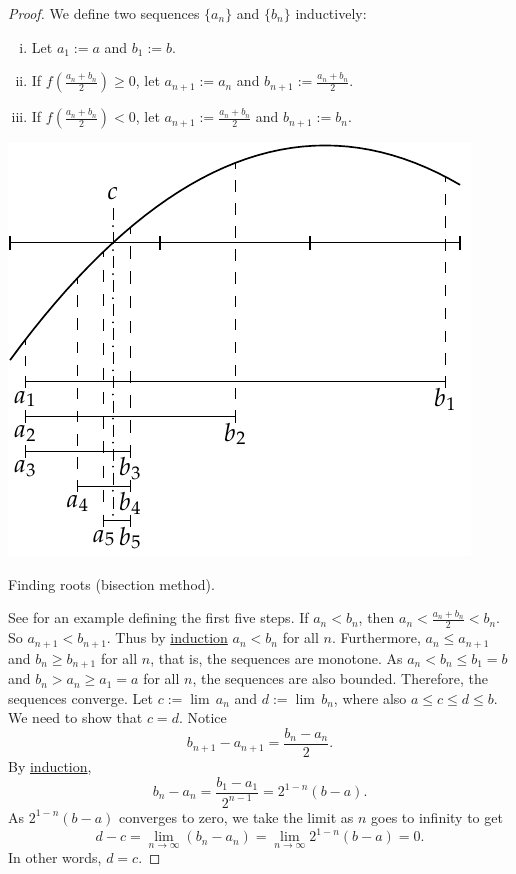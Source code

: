 \begin{proof}
We define two sequences $\{ a_n \}$
and $\{ b_n \}$ inductively:
\begin{enumerate}[(i)]
\item Let $a_1 := a$ and $b_1 := b$.
\item If $f\left(\frac{a_n+b_n}{2}\right) \geq 0$, let $a_{n+1} := a_n$ and
$b_{n+1} := \frac{a_n+b_n}{2}$.
\item If $f\left(\frac{a_n+b_n}{2}\right) < 0$, let $a_{n+1} := \frac{a_n+b_n}{2}$ and
$b_{n+1} := b_n$.
\end{enumerate}
\begin{myfigureht}
\includegraphics{figures/bisect}
\caption{Finding roots (bisection method).\label{bisectfig}}
\end{myfigureht}
See  for an example defining the first five steps.
If $a_n < b_n$, then $a_n < \frac{a_n+b_n}{2} < b_n$.  So
$a_{n+1} < b_{n+1}$.
Thus by \hyperref[induction:thm]{induction} $a_n < b_n$ for all $n$.
Furthermore, $a_n \leq a_{n+1}$ and 
$b_n \geq b_{n+1}$ for all $n$, that is, the sequences are monotone.
As $a_n < b_n \leq b_1 = b$ and 
$b_n > a_n \geq a_1 = a$ for all $n$,
the sequences are also bounded.  Therefore, the
sequences converge.  Let $c := \lim\, a_n$ and $d := \lim\, b_n$,
where also $a \leq c \leq d \leq b$.  We need
to show that $c=d$.
Notice
\begin{equation*}
b_{n+1} - a_{n+1} = \frac{b_n-a_n}{2}.
\end{equation*}
By \hyperref[induction:thm]{induction},
\begin{equation*}
b_n - a_n = \frac{b_1-a_1}{2^{n-1}} = 2^{1-n} (b-a) .
\end{equation*}
As $2^{1-n}(b-a)$ converges to zero, we take the limit as $n$ goes to
infinity to get
\begin{equation*}
d-c = \lim_{n\to\infty} (b_n - a_n) =
\lim_{n\to\infty} 2^{1-n} (b-a) = 0.
\end{equation*}
In other words, $d=c$.


\end{proof}
